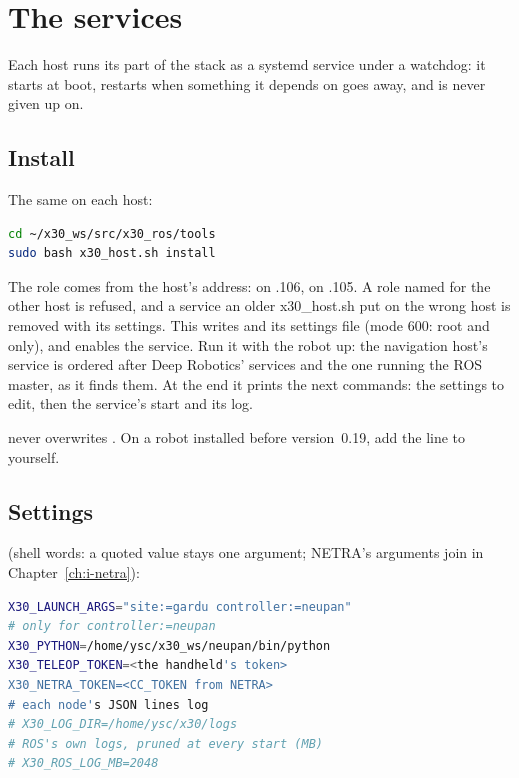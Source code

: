 \chapter{The services}
\label{ch:i-services}

Each host runs its part of the stack as a systemd service under a watchdog: it starts at boot,
restarts when something it depends on goes away, and is never given up on.

\section{Install}

The same on each host:

\begin{lstlisting}[language=bash]
cd ~/x30_ws/src/x30_ros/tools
sudo bash x30_host.sh install
\end{lstlisting}

The role comes from the host's address:  on .106,  on .105. A
role named for the other host is refused, and a service an older x30\_host.sh put on the wrong
host is removed with its settings. This writes  and its settings file
 (mode 600: root and  only), and enables the service. Run it
with the robot up: the navigation host's service is ordered after Deep Robotics' services and
the one running the ROS master, as it finds them. At the end it prints the next commands: the
settings to edit, then the service's start and its log.

\begin{warnbox}
 never overwrites . On a robot installed before
version~0.19, add the line  to  yourself.
\end{warnbox}

\section{Settings}

 (shell words: a quoted value stays one argument; NETRA's
arguments join  in Chapter~\ref{ch:i-netra}):

\begin{lstlisting}[language=bash]
X30_LAUNCH_ARGS="site:=gardu controller:=neupan"
# only for controller:=neupan
X30_PYTHON=/home/ysc/x30_ws/neupan/bin/python
X30_TELEOP_TOKEN=<the handheld's token>
X30_NETRA_TOKEN=<CC_TOKEN from NETRA>
# each node's JSON lines log
# X30_LOG_DIR=/home/ysc/x30/logs
# ROS's own logs, pruned at every start (MB)
# X30_ROS_LOG_MB=2048
\end{lstlisting}

